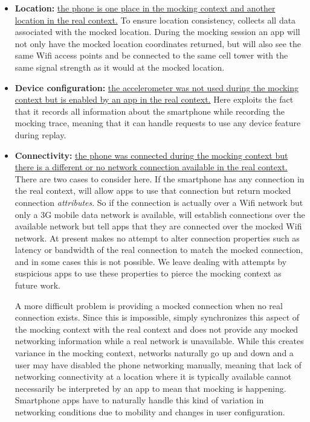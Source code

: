 \begin{itemize}

\item \textbf{Location:} \uline{the phone is one place in the mocking context
and another location in the real context.} To ensure location consistency,
\PocketMocker{} collects all data associated with the mocked location. During
the mocking session an app will not only have the mocked location coordinates
returned, but will also see the same Wifi access points and be connected to
the same cell tower with the same signal strength as it would at the mocked
location.

\item \textbf{Device configuration:} \uline{the accelerometer was not used
during the mocking context but is enabled by an app in the real context.}
Here \PocketMocker{} exploits the fact that it records all information about
the smartphone while recording the mocking trace, meaning that it can handle
requests to use any device feature during replay.

\item \textbf{Connectivity:} \uline{the phone was connected during the
mocking context but there is a different or no network connection available
in the real context.} There are two cases to consider here. If the smartphone
has any connection in the real context, \PocketMocker{} will allow apps to
use that connection but return mocked connection \textit{attributes}. So if
the connection is actually over a Wifi network but only a 3G mobile data
network is available, \PocketMocker{} will establish connections over the
available network but tell apps that they are connected over the mocked Wifi
network. At present \PocketMocker{} makes no attempt to alter connection
properties such as latency or bandwidth of the real connection to match the
mocked connection, and in some cases this is not possible. We leave dealing
with attempts by suspicious apps to use these properties to pierce the
mocking context as future work.

A more difficult problem is providing a mocked connection when no real
connection exists. Since this is impossible, \PocketMocker{} simply
synchronizes this aspect of the mocking context with the real context and
does not provide any mocked networking information while a real network is
unavailable. While this creates variance in the mocking context, networks
naturally go up and down and a user may have disabled the phone networking
manually, meaning that lack of networking connectivity at a location where it
is typically available cannot necessarily be interpreted by an app to mean
that mocking is happening. Smartphone apps have to naturally handle this kind
of variation in networking conditions due to mobility and changes in user
configuration.

\end{itemize}

